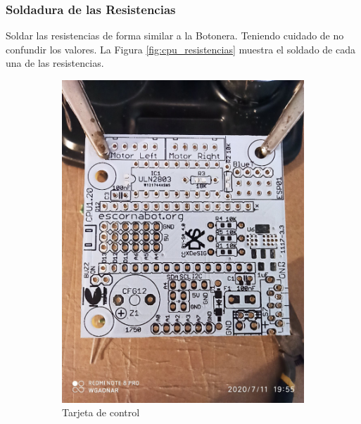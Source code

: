\documentclass{article}
\begin{document}
\subsubsection{Soldadura de las Resistencias}
Soldar las resistencias de forma similar a la Botonera. Teniendo cuidado de no confundir los valores. La Figura \ref{fig:cpu_resistencias} muestra el soldado de cada una de las resistencias.

\begin{figure}[H]
    \centering
    \begin{subfigure}[t]{0.3\textwidth}
        \centering
        \includegraphics[width=0.9\columnwidth, height=1.2\columnwidth]{images/CPU/cpu_inicial.jpg}
        \caption{Tarjeta de control}
        \label{fig:cpu_inicial}
    \end{subfigure}%
    \begin{subfigure}[t]{0.3\textwidth}
        \centering

\end{subfigure}
\end{figure}
\end{document}
